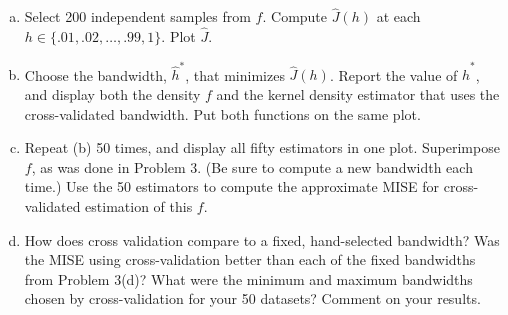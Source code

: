 \documentclass[11pt]{report}
\begin{document}
\begin{enumerate}[1.]
          \begin{enumerate}[(a)]

              \item Select 200 independent samples from $f$. Compute $\widehat J(h)$ at each $h\in\{.01,.02,\ldots,.99,1\}$. Plot $\widehat J$.

              \item Choose the bandwidth, $\hat{h}^*$, that minimizes $\widehat J(h)$. Report the value of $\hat{h}^*$, and display both the density $f$
                    and the kernel density estimator that uses the cross-validated bandwidth. Put both functions on the same plot.

              \item Repeat (b) 50 times, and display all fifty estimators in one plot. Superimpose $f$, as was done in Problem 3. (Be sure to compute a new bandwidth each time.) Use the 50 estimators to compute the approximate MISE for cross-validated estimation of this $f$.

              \item How does cross validation compare to a fixed, hand-selected bandwidth? Was the MISE using cross-validation better than each of the fixed bandwidths from Problem 3(d)? What were the minimum and maximum bandwidths chosen by cross-validation for your 50 datasets?  Comment on your results.

          \end{enumerate}






\end{enumerate}
\end{document}
